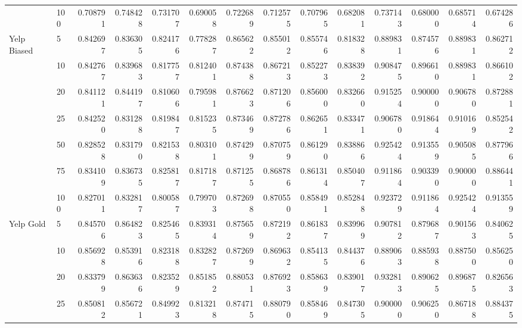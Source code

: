 \begin{tabular}{llrrrrrrrrrrrr}
               & 100 &        0.708791 &     0.748428 &  0.731707 &  0.690058 &        0.722689 &     0.712575 &  0.707965 &  0.682081 &        0.737143 &     0.680000 &  0.685714 &  0.674286 \\
Yelp Biased & 5   &        0.842697 &     0.836305 &  0.824176 &  0.778287 &        0.865622 &     0.855012 &  0.855746 &  0.818328 &        0.889831 &     0.874576 &  0.889831 &  0.862712 \\
               & 10  &        0.842767 &     0.839683 &  0.817757 &  0.812401 &        0.874388 &     0.867213 &  0.852273 &  0.838392 &        0.908475 &     0.896610 &  0.889831 &  0.866102 \\
               & 20  &        0.841121 &     0.844197 &  0.810606 &  0.795981 &        0.876623 &     0.871206 &  0.856000 &  0.832660 &        0.915254 &     0.900000 &  0.906780 &  0.872881 \\
               & 25  &        0.842520 &     0.831288 &  0.819847 &  0.815235 &        0.873469 &     0.872786 &  0.862651 &  0.833471 &        0.906780 &     0.918644 &  0.910169 &  0.852542 \\
               & 50  &        0.828528 &     0.831790 &  0.821538 &  0.803101 &        0.874299 &     0.870759 &  0.861290 &  0.838866 &        0.925424 &     0.913559 &  0.905085 &  0.877966 \\
               & 75  &        0.834109 &     0.836735 &  0.825817 &  0.817187 &        0.871255 &     0.868786 &  0.861314 &  0.850407 &        0.911864 &     0.903390 &  0.900000 &  0.886441 \\
               & 100 &        0.827011 &     0.832817 &  0.800587 &  0.799703 &        0.872698 &     0.870550 &  0.858491 &  0.852848 &        0.923729 &     0.911864 &  0.925424 &  0.913559 \\
Yelp Gold & 5   &        0.845706 &     0.864823 &  0.825465 &  0.839314 &        0.875659 &     0.872192 &  0.861837 &  0.839969 &        0.907812 &     0.879687 &  0.901563 &  0.840625 \\
               & 10  &        0.856928 &     0.853916 &  0.823188 &  0.832827 &        0.872699 &     0.869632 &  0.854135 &  0.844376 &        0.889063 &     0.885938 &  0.887500 &  0.856250 \\
               & 20  &        0.833799 &     0.863636 &  0.823529 &  0.851852 &        0.880531 &     0.876923 &  0.858639 &  0.839017 &        0.932813 &     0.890625 &  0.896875 &  0.826563 \\
               & 25  &        0.850812 &     0.856721 &  0.849923 &  0.813218 &        0.874715 &     0.880790 &  0.858469 &  0.847305 &        0.900000 &     0.906250 &  0.867188 &  0.884375 \\

\end{tabular}

